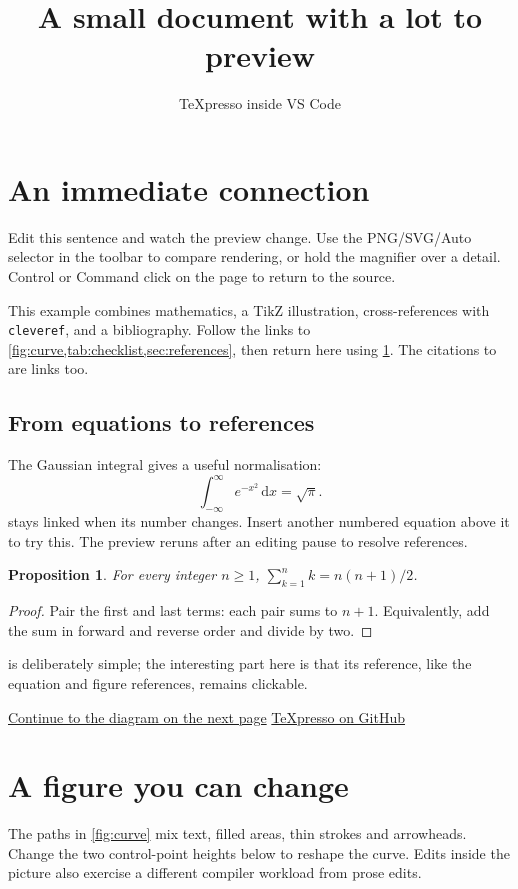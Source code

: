 \documentclass{article}
\title{A small document with a lot to preview}
\author{TeXpresso inside VS Code}
\date{}
\newtheorem{proposition}{Proposition}
\begin{document}
\maketitle
\section{An immediate connection}\label{sec:start}
Edit this sentence and watch the preview change. Use the PNG/SVG/Auto selector
in the toolbar to compare rendering, or hold the magnifier over a detail.
Control or Command click on the page to return to the source.

This example combines mathematics, a TikZ illustration, cross-references with
\texttt{cleveref}, and a bibliography. Follow the links to
\cref{fig:curve,tab:checklist,sec:references}, then return here using
\cref{sec:start}. The citations to \cite{knuth1984,tikz} are links too.

\subsection{From equations to references}
The Gaussian integral gives a useful normalisation:
\begin{equation}\label{eq:gaussian}
  \int_{-\infty}^{\infty} e^{-x^2}\,\mathrm{d}x=\sqrt{\pi}.
\end{equation}
 stays linked when its number changes. Insert another numbered
equation above it to try this. The preview reruns after an editing pause to
resolve references.

\begin{proposition}\label{prop:sum}
For every integer $n\geq1$, $\sum_{k=1}^{n}k=n(n+1)/2$.
\end{proposition}
\begin{proof}
Pair the first and last terms: each pair sums to $n+1$.
Equivalently, add the sum in forward and reverse order and divide by two.
\end{proof}
 is deliberately simple; the interesting part here is that its
reference, like the equation and figure references, remains clickable.

\medskip
\noindent\hyperref[fig:curve]{Continue to the diagram on the next page}
\hfill\href{https://github.com/let-def/texpresso}{TeXpresso on GitHub}

\newpage
\section{A figure you can change}\label{sec:figure}
The paths in \cref{fig:curve} mix text, filled areas, thin strokes and arrowheads.
Change the two control-point heights below to reshape the curve. Edits inside
the picture also exercise a different compiler workload from prose edits.
\end{document}
